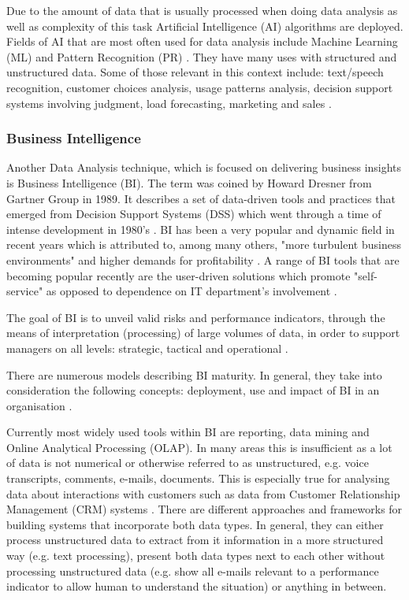 Due to the amount of data that is usually processed when doing data analysis as well as complexity of this task Artificial Intelligence (AI) algorithms are deployed. Fields of AI that are most often used for data analysis include Machine Learning (ML) and Pattern Recognition (PR) \citep{bishop2006pattern}. They have many uses with structured and unstructured data. Some of those relevant in this context include: text/speech recognition, customer choices analysis, usage patterns analysis, decision support systems involving judgment, load forecasting, marketing and sales \citep{witten2005data}.
			
			\subsubsection{Business Intelligence}
Another Data Analysis technique, which is focused on delivering business insights is Business Intelligence (BI). The term was coined by Howard Dresner from Gartner Group in 1989. It describes a set of data-driven tools and practices that emerged from Decision Support Systems (DSS) which went through a time of intense development in 1980's \citep{power2008decision}. BI has been a very popular and dynamic field in recent years which is attributed to, among many others, "more turbulent business environments" and higher demands for profitability \citep{sacu2010bidm, power2008decision, baars2008management}. A range of BI tools that are becoming popular recently are the user-driven solutions which promote "self-service" as opposed to dependence on IT department's involvement \citep{IBM2015a, Qlik2015, Microsoft2015, imhoff2011self}.

The goal of BI is to unveil valid risks and performance indicators, through the means of interpretation (processing) of large volumes of data, in order to support managers on all levels: strategic, tactical and operational \citep{baars2008management}.

There are numerous models describing BI maturity. In general, they take into consideration the following concepts: deployment, use and impact of BI in an organisation \citep{Lahrmann2011}.

Currently most widely used tools within BI are reporting, data mining and Online Analytical Processing (OLAP). In many areas this is insufficient as a lot of data is not numerical or otherwise referred to as unstructured, e.g. voice transcripts, comments, e-mails, documents. This is especially true for analysing data about interactions with customers such as data from Customer Relationship Management (CRM) systems \citep{baars2008management}. There are different approaches and frameworks for building systems that incorporate both data types. In general, they can either process unstructured data to extract from it information in a more structured way (e.g. text processing), present both data types next to each other without processing unstructured data (e.g. show all e-mails relevant to a performance indicator to allow human to understand the situation) or anything in between.

